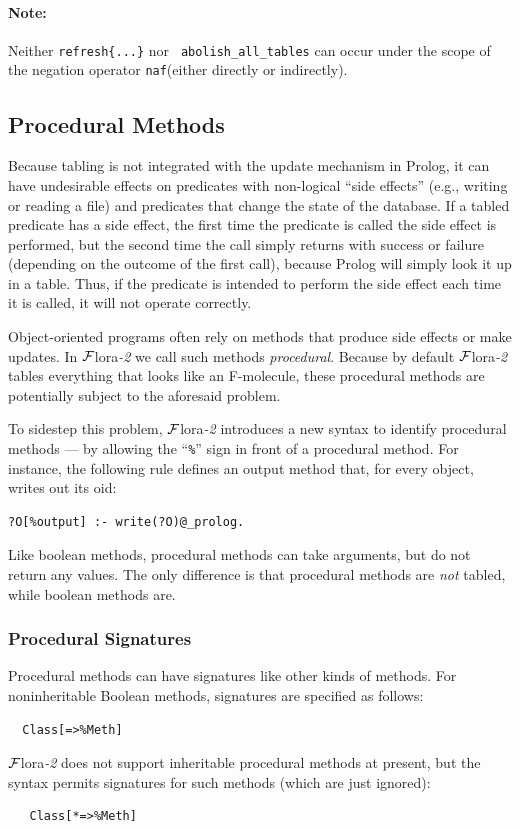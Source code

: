 \documentclass[11pt]{article}
\newcommand{\FLORA}{{\mbox{\sc ${\cal F}${lora}\rm\emph{-2}}}\xspace}
\newcommand{\SILKNAF}{{{\tt naf}}\xspace}
\begin{document}
\paragraph{Note:} Neither {\tt refresh\{...\}} nor {\tt
  abolish\_all\_tables} can occur under the scope of the
negation operator  \SILKNAF (either directly or indirectly).


\subsection{Procedural Methods}\label{sec-proc-methods}

%
Because tabling is not integrated with the update mechanism in Prolog, it can
have undesirable effects on predicates with non-logical ``side effects''
(e.g., writing or reading a file) and predicates that change the state of
the database.  If a tabled predicate has a side effect, the first time the
predicate is called the side effect is performed, but the second time the
call simply returns with success or failure (depending on the outcome of
the first call), because Prolog will simply look it up in a table.  Thus, if
the predicate is intended to perform the side effect each time it is
called, it will not operate correctly.

Object-oriented programs often rely on methods that produce side effects
or make updates.  In \FLORA we call such methods \emph{procedural}.
Because by default \FLORA tables everything that looks like an F-molecule,
these procedural methods are potentially subject to the aforesaid problem.

To sidestep this problem, \FLORA introduces a new syntax to identify
procedural methods --- by allowing the ``\verb|%|'' sign in front of a
procedural method. For instance, the following rule defines an output
method that, for every object, writes out its oid:
\begin{verbatim}
?O[%output] :- write(?O)@_prolog.
\end{verbatim}
Like boolean methods, procedural methods can take arguments, but do not
return any values.  The only difference is that procedural methods are
\emph{not} tabled, while boolean methods are.

\subsubsection{Procedural Signatures}

Procedural methods can have signatures like other kinds of methods.
For noninheritable Boolean methods, signatures are specified as follows:
\begin{verbatim}
  Class[=>%Meth]
\end{verbatim}
\FLORA does not support inheritable procedural methods at present, but the
syntax permits signatures for such methods (which are just ignored):
\begin{verbatim}
   Class[*=>%Meth]
\end{verbatim}
\end{document}
